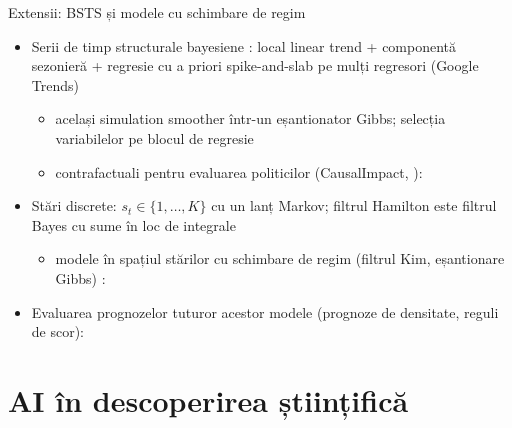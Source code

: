 \begin{frame}{Extensii: BSTS și modele cu schimbare de regim}
\itemsize{\small}
\begin{itemize}
    \item Serii de timp structurale bayesiene : local linear trend + componentă sezonieră + regresie cu a priori spike-and-slab pe mulți regresori (Google Trends)
    \begin{itemize}
        \item același simulation smoother într-un eșantionator Gibbs; selecția variabilelor pe blocul de regresie
        \item contrafactuali pentru evaluarea politicilor (CausalImpact, ): 
    \end{itemize}
    \item Stări discrete: $s_t \in \{1, \dots, K\}$ cu un lanț Markov; filtrul Hamilton este filtrul Bayes cu sume în loc de integrale
    \begin{itemize}
        \item modele în spațiul stărilor cu schimbare de regim (filtrul Kim, eșantionare Gibbs) : 
    \end{itemize}
    \item Evaluarea prognozelor tuturor acestor modele (prognoze de densitate, reguli de scor): 
\end{itemize}
\end{frame}


\section{AI în descoperirea științifică}

